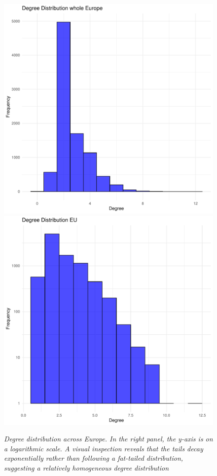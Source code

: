 \begin{figure}
	\centering
	\includegraphics[width=0.48\linewidth]{images/DDEU.pdf}
	\includegraphics[width=0.48\linewidth]{images/DDEULog.pdf}
	\caption{\textit{Degree distribution across Europe. In the right panel, the y-axis is on a logarithmic scale. A visual inspection reveals that the tails decay exponentially rather than following a fat-tailed distribution, suggesting a relatively homogeneous degree distribution}}
	\label{fig::ddeu}
\end{figure}

